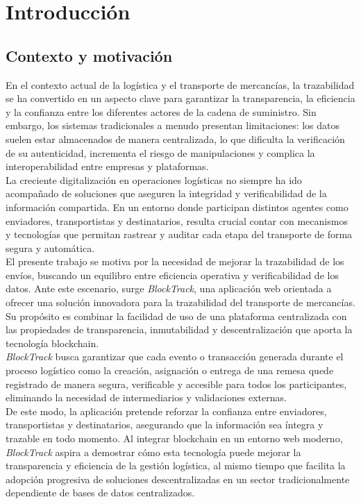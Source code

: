  \raggedbottom
\chapter{Introducción}
\section{Contexto y motivación}
En el contexto actual de la logística y el transporte de mercancías, la trazabilidad se ha convertido en un aspecto clave
para garantizar la transparencia, la eficiencia y la confianza entre los diferentes actores de la cadena de suministro. Sin embargo, los sistemas tradicionales a menudo
presentan limitaciones: los datos suelen estar almacenados de manera centralizada, lo que dificulta la verificación de su autenticidad,
incrementa el riesgo de manipulaciones y complica la interoperabilidad entre empresas y plataformas.\\

La creciente digitalización en operaciones logísticas no siempre ha ido acompañado de soluciones que aseguren la integridad y
verificabilidad de la información compartida. En un entorno donde participan distintos agentes como enviadores, transportistas y destinatarios, resulta 
crucial contar con mecanismos y tecnologías que permitan rastrear y auditar cada etapa del transporte de forma segura y automática.\\

El presente trabajo se motiva por la necesidad de mejorar la trazabilidad de los envíos, buscando un equilibro entre eficiencia operativa
y verificabilidad de los datos. Ante este escenario, surge \textit{BlockTrack}, una aplicación web orientada a ofrecer una
solución innovadora para la trazabilidad del transporte de mercancías. Su propósito es combinar la facilidad de uso de una plataforma
centralizada con las propiedades de transparencia, inmutabilidad y descentralización que aporta la tecnología blockchain.\\

\textit{BlockTrack} busca garantizar que cada evento o transacción generada durante el proceso logístico como la creación,
asignación o entrega de una remesa quede registrado de manera segura, verificable y accesible para todos los participantes,
eliminando la necesidad de intermediarios y validaciones externas.\\

De este modo, la aplicación pretende reforzar la confianza entre enviadores, transportistas y destinatarios, asegurando
que la información sea íntegra y trazable en todo momento. Al integrar blockchain en un entorno web moderno,
\textit{BlockTrack} aspira a demostrar cómo esta tecnología puede mejorar la transparencia y eficiencia de la gestión logística,
al mismo tiempo que facilita la adopción progresiva de soluciones descentralizadas en un sector tradicionalmente dependiente de 
bases de datos centralizados.


